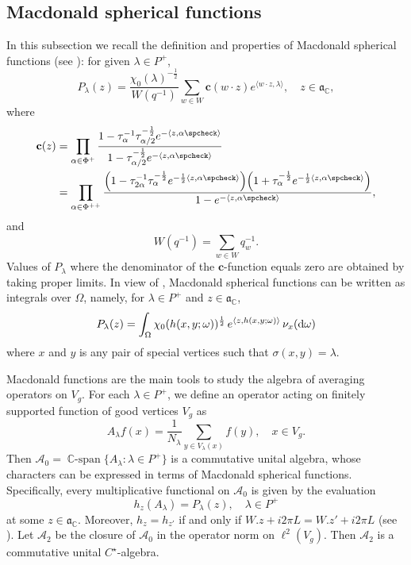 \documentclass[11pt]{amsart}
\newcommand{\CC}{\mathbb{C}}
\newcommand{\bfc}{\mathbf{c}}
\newcommand{\sprod}[2]{\langle {#1}, {#2} \rangle}
\newcommand{\cspan}{\operatorname{\mathbb{C}-span}}
\theoremstyle{plain}
\theoremstyle{definition}
\numberwithin{equation}{section}
\begin{document}
\subsection{Macdonald spherical functions}
In this subsection we recall the definition and properties of Macdonald spherical functions (see \cite{macdo0}): 
for given $\lambda \in P^+$, 
\[
	P_\lambda(z) = \frac{\chi_0(\lambda)^{-\frac{1}{2}} }{W(q^{-1})}
	\sum_{w \in W} \bfc(w \cdot z) e^{\sprod{w \cdot z}{\lambda}}, \quad z \in \mathfrak{a}_{\mathbb{C}},
\]
where
\begin{align*}
	\bfc(z)
	&= \prod_{\alpha \in \Phi^+} \frac{1 - \tau_\alpha^{-1} \tau_{\alpha/2}^{-\frac{1}{2}} e^{-\sprod{z}{\alpha\spcheck}}}
	{1-\tau_{\alpha/2}^{-\frac{1}{2}} e^{-\sprod{z}{\alpha\spcheck}}} \\
	&=
	\prod_{\alpha \in \Phi^{++}}
	\frac{\Big(1 - \tau_{2\alpha}^{-1} \tau_{\alpha}^{-\frac{1}{2}} e^{-\frac{1}{2}\sprod{z}{\alpha\spcheck}}\Big)
		\Big(1 + \tau_{\alpha}^{-\frac{1}{2}} e^{-\frac{1}{2} \sprod{z}{\alpha\spcheck}}\Big)}
	{1 - e^{-{\sprod{z}{\alpha\spcheck}}}}, 
\end{align*}
and
\[
	W(q^{-1})=\sum_{w \in W} q_w^{-1}.
\]
Values of $P_\lambda$ where the denominator of the $\bfc$-function equals zero are obtained by taking proper limits. 
In view of \cite[formula (6.6)]{park2}, Macdonald spherical functions can be written as integrals over $\Omega$,
namely, for $\lambda \in P^+$ and $z \in \mathfrak{a}_{\CC}$,
\begin{equation}
	\label{eq:9}
	P_\lambda(z)=
	\int_{\Omega} \chi_0(h(x, y; \omega))^{\frac{1}{2}} \, e^{\langle z, h(x, y ; \omega)\rangle} \,\nu_x({\rm d} \omega)
\end{equation}
where $x$ and $y$ is any pair of special vertices such that $\sigma(x, y) = \lambda$.

Macdonald functions are the main tools to study the algebra of averaging operators on $V_g$. For each $\lambda \in P^+$,
we define an operator acting on finitely supported function of good vertices $V_g$ as
\[
	A_\lambda f(x)=\frac1{N_\lambda}\sum_{y\in V_\lambda(x)}f(y), \quad x \in V_g. 
\]
Then $\mathscr{A}_0=\cspan\{A_\lambda:\lambda\in P^+\}$ is a commutative unital algebra, whose characters can be expressed 
in terms of Macdonald spherical functions. Specifically, every multiplicative functional on 
$\mathscr{A}_0$ is given by the evaluation
\[
	h_z(A_\lambda)=P_\lambda(z), \quad \lambda\in P^+
\]
at some $z\in\mathfrak{a}_\mathbb{C}$. Moreover, $h_z=h_{z'}$ if and only if $W.z+i 2\pi L=W.z'+i2\pi L$ 
(see \cite[Theorem 3.3.12(ii)]{macdo0}). Let $\mathscr{A}_2$ be the closure of $\mathscr{A}_0$ in the operator norm on 
$\ell^2(V_g)$. Then $\mathscr{A}_2$ is a commutative unital $C^\star$-algebra. 
\end{document}
